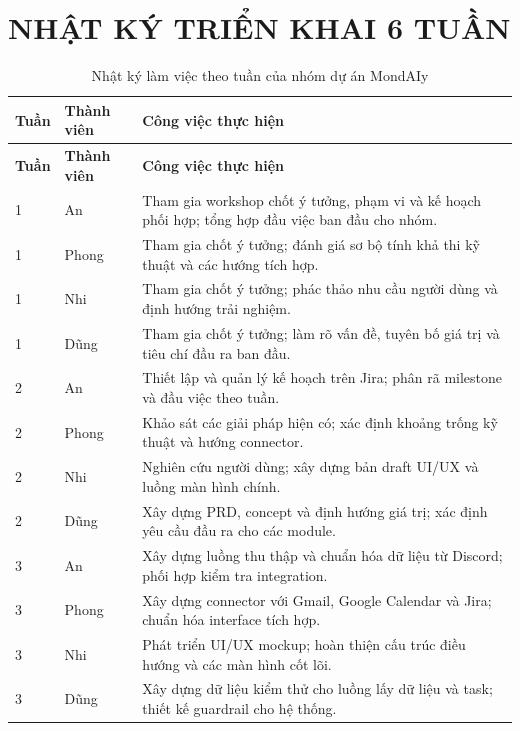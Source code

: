 \documentclass[12pt,a4paper]{article}
\begin{document}
\clearpage
\section{NHẬT KÝ TRIỂN KHAI 6 TUẦN}

\small
\renewcommand{\arraystretch}{1.2}
\setlength{\tabcolsep}{5pt}
\begin{longtable}{@{}C{1.2cm}P{3.0cm}P{11.8cm}@{}}
\caption{Nhật ký làm việc theo tuần của nhóm dự án MondAIy}
\label{tab:weekly-log}\\
\color{white}\textbf{Tuần} & \color{white}\textbf{Thành viên} &
\color{white}\textbf{Công việc thực hiện}\\
\toprule
\endfirsthead

\color{white}\textbf{Tuần} & \color{white}\textbf{Thành viên} &
\color{white}\textbf{Công việc thực hiện}\\
\toprule
\endhead

\bottomrule
\endlastfoot

1 & An & Tham gia workshop chốt ý tưởng, phạm vi và kế hoạch phối hợp; tổng hợp đầu việc ban đầu cho nhóm.\\
1 & Phong & Tham gia chốt ý tưởng; đánh giá sơ bộ tính khả thi kỹ thuật và các hướng tích hợp.\\
1 & Nhi & Tham gia chốt ý tưởng; phác thảo nhu cầu người dùng và định hướng trải nghiệm.\\
1 & Dũng & Tham gia chốt ý tưởng; làm rõ vấn đề, tuyên bố giá trị và tiêu chí đầu ra ban đầu.\\

2 & An & Thiết lập và quản lý kế hoạch trên Jira; phân rã milestone và đầu việc theo tuần.\\
2 & Phong & Khảo sát các giải pháp hiện có; xác định khoảng trống kỹ thuật và hướng connector.\\
2 & Nhi & Nghiên cứu người dùng; xây dựng bản draft UI/UX và luồng màn hình chính.\\
2 & Dũng & Xây dựng PRD, concept và định hướng giá trị; xác định yêu cầu đầu ra cho các module.\\

3 & An & Xây dựng luồng thu thập và chuẩn hóa dữ liệu từ Discord; phối hợp kiểm tra integration.\\
3 & Phong & Xây dựng connector với Gmail, Google Calendar và Jira; chuẩn hóa interface tích hợp.\\
3 & Nhi & Phát triển UI/UX mockup; hoàn thiện cấu trúc điều hướng và các màn hình cốt lõi.\\
3 & Dũng & Xây dựng dữ liệu kiểm thử cho luồng lấy dữ liệu và task; thiết kế guardrail cho hệ thống.\\


\end{longtable}
\end{document}
